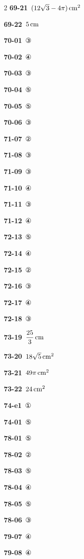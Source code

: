\documentclass[10pt,a4paper]{article}
\begin{document}
\begin{multicols}{2}
\noindent\textbf{69-21}\ $(12\sqrt{3}-4\pi)\mkern3mu \mathrm{cm}^2$\par
\noindent\textbf{69-22}\ $5\mkern3mu \mathrm{cm}$\par
\noindent\textbf{70-01}\ ③\par
\noindent\textbf{70-02}\ ④\par
\noindent\textbf{70-03}\ ③\par
\noindent\textbf{70-04}\ ⑤\par
\noindent\textbf{70-05}\ ⑤\par
\noindent\textbf{70-06}\ ③\par
\noindent\textbf{71-07}\ ②\par
\noindent\textbf{71-08}\ ③\par
\noindent\textbf{71-09}\ ③\par
\noindent\textbf{71-10}\ ④\par
\noindent\textbf{71-11}\ ③\par
\noindent\textbf{71-12}\ ④\par
\noindent\textbf{72-13}\ ⑤\par
\noindent\textbf{72-14}\ ④\par
\noindent\textbf{72-15}\ ②\par
\noindent\textbf{72-16}\ ③\par
\noindent\textbf{72-17}\ ④\par
\noindent\textbf{72-18}\ ③\par
\noindent\textbf{73-19}\ $\dfrac{25}{3}\mkern3mu \mathrm{cm}$\par
\noindent\textbf{73-20}\ $18\sqrt{5}\mkern3mu \mathrm{cm}^2$\par
\noindent\textbf{73-21}\ $49\pi\mkern3mu \mathrm{cm}^2$\par
\noindent\textbf{73-22}\ $24\mkern3mu \mathrm{cm}^2$\par
\noindent\textbf{74-e1}\ ①\par
\noindent\textbf{74-01}\ ⑤\par
\noindent\textbf{78-01}\ ⑤\par
\noindent\textbf{78-02}\ ②\par
\noindent\textbf{78-03}\ ⑤\par
\noindent\textbf{78-04}\ ④\par
\noindent\textbf{78-05}\ ⑤\par
\noindent\textbf{78-06}\ ③\par
\noindent\textbf{79-07}\ ④\par
\noindent\textbf{79-08}\ ④\par

\end{multicols}
\end{document}
